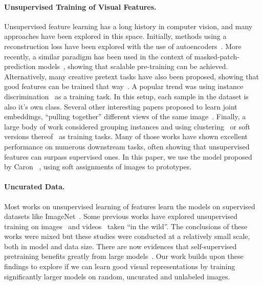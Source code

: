 \documentclass[10pt,twocolumn,letterpaper]{article}
\begin{document}
\paragraph{Unsupervised Training of Visual Features.}
Unsupervised feature learning has a long history in computer vision, and many approaches have been explored in this space.
Initially, methods using a reconstruction loss have been explored with the use of autoencoders~\cite{ranzato2007unsupervised,vincent2008extracting}.
More recently, a similar paradigm has been used in the context of masked-patch-prediction models~\cite{bao2021beit,xie2021simmim,he2021masked}, showing that scalable pre-training can be achieved.
Alternatively, many creative pretext tasks have also been proposed, showing that good features can be trained that way~\cite{doersch2015unsupervised,agrawal2015learning,jenni2018self,kim2018learning,larsson2016learning,mahendran2018cross,misra2016shuffle,misra2020self,pathak2017learning,pathak2016context,wang2015unsupervised,wang2017transitive,zhang2017split}.
A popular trend was using instance discrimination~\cite{bojanowski2017unsupervised,chen2020simple,chen2020improved,dosovitskiy2016discriminative,hadsell2006dimensionality,he2020momentum,wu2018unsupervised} as a training task.
In this setup, each sample in the dataset is also it's own class.
Several other interesting papers proposed to learn joint embeddings, ``pulling together'' different views of the same image~\cite{grill2020bootstrap,bardes2021vicreg,zbontar2021barlow}.
Finally, a large body of work considered grouping instances and using clustering~\cite{asano2019self,caron2018deep,coates2011analysis,gidaris2020obow,huang2019unsupervised,junnan2021prototypical,xie2016unsupervised,yang2016joint,zhuang2019local} or soft versions thereof~\cite{caron2020unsupervised,caron2021emerging} as training tasks.
Many of those works have shown excellent performance on numerous downstream tasks, often showing that unsupervised features can surpass supervised ones.
In this paper, we use the model proposed by Caron \etal~\cite{caron2020unsupervised}, using soft assignments of images to prototypes.

\paragraph{Uncurated Data.}
Most works on unsupervised learning of features learn the models on supervised datasets like ImageNet~\cite{russakovsky2015imagenet}.
Some previous works have explored unsupervised training on images~\cite{caron2019unsupervised,doersch2015unsupervised,goyal2019scaling} and videos~\cite{miech2020end} taken ``in the wild''.
The conclusions of these works were mixed but these studies were conducted at a relatively small scale, both in model and data size.
There are now evidences that self-supervised pretraining benefits greatly from large models~\cite{caron2020unsupervised,chen2020big, henaff2019data,goyal2021self}.
Our work builds upon these findings to explore if we can learn good visual representations by training significantly larger models on random, uncurated and unlabeled images.
\end{document}
